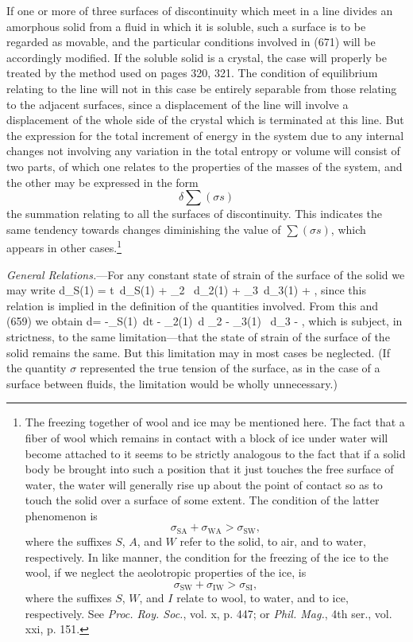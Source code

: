 \documentclass[12pt]{article}
\newcommand{\dd}{\delta}
\begin{document}
If one or more of three surfaces of discontinuity which meet in a line divides an amorphous solid from a fluid in which it is soluble, such a surface is to be regarded as movable, and the particular conditions involved in (671) will be accordingly modified. If the soluble solid is a crystal, the case will properly be treated by the method used on pages 320, 321. The condition of equilibrium relating to the line will not in this case be entirely separable from those relating to the adjacent surfaces, since a displacement of the line will involve a displacement of the whole side of the crystal which is terminated at this line. But the expression for the total increment of energy in the system  due to any internal changes not involving any variation in the total entropy or volume will consist of two parts, of which one relates to the properties of the masses of the system, and the other may be expressed in the form
$$ \dd \sum(\sigma s)$$
the summation relating to all the surfaces of discontinuity. This indicates the same tendency towards changes diminishing the value of $\sum(\sigma s)$, which appears in other cases.\footnote{The freezing together of wool and ice may be mentioned here. The fact that a fiber of wool which remains in contact with a block of ice under water will become attached to it seems to be strictly analogous to the fact that if a solid body be brought into such a position that it just touches the free surface of water, the water will generally rise up about the point of contact so as to touch the solid over a surface of some extent. The condition of the latter phenomenon is
$$ \sigma_{\text{SA}} + \sigma_{\text{WA}} > \sigma_{\text{SW}} ,$$
where the suffixes $S$, $A$, and $W$ refer to the solid, to air, and to water, respectively. In like manner, the condition for the freezing of the ice to the wool, if we neglect the aeolotropic properties of the ice, is
$$ \sigma_{\text{SW}} + \sigma_{\text{IW}} > \sigma_{\text{SI}},$$
where the suffixes $S$, $W$, and $I$ relate to wool, to water, and to ice, respectively. See \textit{Proc. Roy. Soc.}, vol. x, p. 447; or \textit{Phil. Mag.}, 4th ser., vol. xxi, p. 151.}

\textit{General Relations.}---For any constant state of strain of the surface of the solid we may write
\eqs d\epsilon_{S(1)} = t\, d\eta_{S(1)} + \mu_2 \, d\Gamma_{2(1)} + \mu_3\, d\Gamma_{3(1)} + , \label{674} \eqe
since this relation is implied in the definition of the quantities involved. From this and (659) we obtain
\eqs d\sigma = -\eta_{S(1)}\, dt - \Gamma_{2(1)}\, d \mu_2 - \Gamma_{3(1)} \, d\mu_3 - ,  \label{675} \eqe
which is subject, in strictness, to the same limitation---that the state of strain of the surface of the solid remains the same. But this limitation may in most cases be neglected. (If the quantity $\sigma$ represented the true tension of the surface, as in the case of a surface between fluids, the limitation would be wholly unnecessary.)
\end{document}
